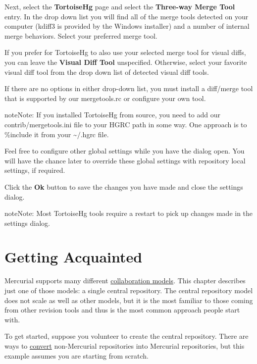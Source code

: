 \documentclass[letterpaper,10pt,english]{manual}
\begin{document}
Next, select the \textbf{TortoiseHg} page and select the
\textbf{Three-way Merge Tool} entry.  In the drop down list you will
find all of the merge tools detected on your computer (kdiff3 is
provided by the Windows installer) and a number of internal merge
behaviors.  Select your preferred merge tool.

If you prefer for TortoiseHg to also use your selected merge tool for
visual diffs, you can leave the \textbf{Visual Diff Tool}
unspecified.  Otherwise, select your favorite visual diff tool from the
drop down list of detected visual diff tools.

If there are no options in either drop-down list, you must install a
diff/merge tool that is supported by our mergetools.rc or configure your
own tool.

\begin{notice}{note}{Note:}
If you installed TortoiseHg from source, you need to add our
contrib/mergetools.ini file to your HGRC path in some way.  One
approach is to \%include it from your \textasciitilde{}/.hgrc file.
\end{notice}

Feel free to configure other global settings while you have the dialog
open.  You will have the chance later to override these global settings
with repository local settings, if required.

Click the \textbf{Ok} button to save the changes you have made and
close the settings dialog.

\begin{notice}{note}{Note:}
Most TortoiseHg tools require a restart to pick up changes made in the
settings dialog.
\end{notice}


\section{Getting Acquainted}

Mercurial supports many different
\href{http://hgbook.red-bean.com/read/collaborating-with-other-people.html}{collaboration models}.
This chapter describes just one of those models: a single central repository.
The central repository model does not scale as well as other models, but
it is the most familiar to those coming from other revision tools and
thus is the most common approach people start with.

To get started, suppose you volunteer to create the central repository.
There are ways to \href{http://mercurial.selenic.com/wiki/RepositoryConversion}{convert}
non-Mercurial repositories into Mercurial repositories, but this example
assumes you are starting from scratch.
\end{document}
